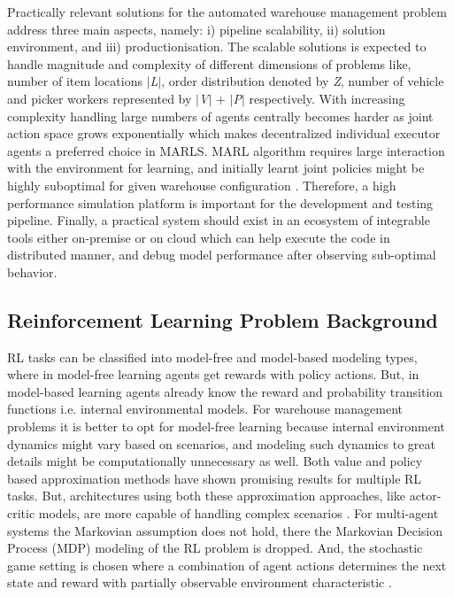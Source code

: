 \documentclass{article}
\begin{document}
Practically relevant solutions for the automated warehouse management problem address three main aspects, namely: i) pipeline scalability, ii) solution environment, and iii) productionisation.
The scalable solutions is expected to handle magnitude and complexity of different dimensions of problems like, number of item locations \textit{$|$L$|$}, order distribution denoted by \textit{Z}, number of vehicle and picker workers represented by \textit{$|$V$|$} + \textit{$|$P$|$} respectively.
With increasing complexity handling large numbers of agents centrally becomes harder as joint action space grows exponentially which makes decentralized individual executor agents a preferred choice in MARLS.
MARL algorithm requires large interaction with the environment for learning, and initially learnt joint policies might be highly suboptimal for given warehouse configuration \cite{papoudakis2020benchmarking}.
Therefore, a high performance simulation platform is important for the development and testing pipeline.
Finally, a practical system should exist in an ecosystem of integrable tools either on-premise or on cloud which can help execute the code in distributed manner, and debug model performance after observing sub-optimal behavior.


\subsection{Reinforcement Learning Problem Background} \label{rl-problem-background}


RL tasks can be classified into model-free and model-based modeling types, where in model-free learning agents get rewards with policy actions.
But, in model-based learning agents already know the reward and probability transition functions i.e. internal environmental models.
For warehouse management problems it is better to opt for model-free learning because internal environment dynamics might vary based on scenarios, and modeling such dynamics to great details might be computationally unnecessary as well.
Both value and policy based approximation methods have shown promising results for multiple RL tasks.
But, architectures using both these approximation approaches, like actor-critic models, are more capable of handling complex scenarios \cite{sutton2018reinforcement}.
For multi-agent systems the Markovian assumption does not hold, there the Markovian Decision Process (MDP) modeling of the RL problem is dropped. And, the stochastic game setting is chosen where a combination of agent actions determines the next state and reward with partially observable environment characteristic \cite{hansen2004dynamic}.
\end{document}

